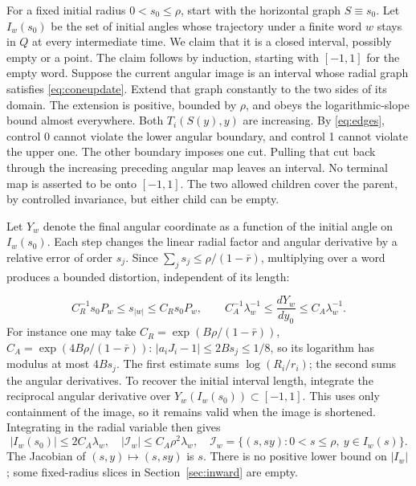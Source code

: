 \documentclass[11pt]{amsart}
\theoremstyle{definition}
\theoremstyle{remark}
\numberwithin{equation}{section}
\begin{document}
For a fixed initial radius \(0<s_0\le\rho\), start with the horizontal
graph \(S\equiv s_0\). Let \(I_w(s_0)\) be the set of initial angles
whose trajectory under a finite word \(w\) stays in $Q$ at every
intermediate time. We claim that it is a closed interval, possibly empty or a point.
The claim follows by induction, starting with $[-1,1]$ for the
empty word. Suppose the current angular image is an interval
whose radial graph satisfies \eqref{eq:coneupdate}. Extend that graph
constantly to the two sides of its domain. The extension is positive,
bounded by \(\rho\), and obeys the logarithmic-slope bound almost
everywhere. Both \(T_i(S(y),y)\) are increasing. By \eqref{eq:edges}, control 0
cannot violate the lower angular boundary, and control 1 cannot
violate the upper one. The other boundary imposes one cut. Pulling
that cut back through the increasing preceding angular map leaves
an interval. No terminal map is asserted to be onto \([-1,1]\).
The two allowed children cover the parent, by controlled invariance,
but either child can be empty.

Let $Y_w$ denote the final angular coordinate as a function of the
initial angle on $I_w(s_0)$. Each step changes the linear radial
factor and angular derivative by a relative error of order $s_j$.
Since $\sum_j s_j\le\rho/(1-\bar r)$, multiplying over a word
produces a bounded distortion, independent of its length:

\begin{equation}
C_R^{-1}s_0P_w\le s_{|w|}
                  \le C_Rs_0P_w,\qquad
 C_A^{-1}\lambda_w^{-1}\le \frac{dY_w}{dy_0}
                  \le C_A\lambda_w^{-1}.                    \label{eq:products}
\end{equation}
For instance one may take
\(C_R=\exp(B\rho/(1-\bar r))\),
\(C_A=\exp(4B\rho/(1-\bar r))\):
\(|a_iJ_i-1|\le2Bs_j\le1/8\), so its logarithm has modulus at
most \(4Bs_j\). The first estimate sums \(\log(R_i/r_i)\);
the second sums the angular derivatives. To recover the initial interval length, integrate the reciprocal
angular derivative over $Y_w(I_w(s_0))\subset[-1,1]$. This uses
only containment of the image, so it remains valid when the image
is shortened. Integrating in the radial variable then gives
\begin{equation}
|I_w(s_0)|\le2C_A\lambda_w,
 \quad |\mathcal I_w|\le C_A\rho^2\lambda_w,
 \quad \mathcal I_w=\{(s,sy):0<s\le\rho,\ y\in I_w(s)\}.      \label{eq:striparea}
\end{equation}
The Jacobian of \((s,y)\mapsto(s,sy)\) is \(s\).
There is no positive lower bound on \(|I_w|\); some fixed-radius slices in Section~\ref{sec:inward} are empty.
\end{document}
